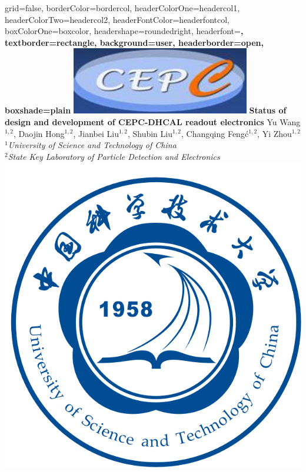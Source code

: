 \documentclass[a0paper,portrait]{baposter}
\begin{document}
\begin{poster}{
grid=false,
borderColor=bordercol, %
headerColorOne=headercol1, %
headerColorTwo=headercol2, %
headerFontColor=headerfontcol, %
boxColorOne=boxcolor, %
headershape=roundedright, %
headerfont=\Large\sf\bf, %
textborder=rectangle,
background=user,
headerborder=open, %
boxshade=plain
}
{\includegraphics[scale=0.3]{CEPCLogo.jpg}}
%
%
{ \bf  \huge {Status of design and development of CEPC-DHCAL readout electronics} } %
{\vspace{0.3em} \smaller Yu Wang$^{1,2}$, Daojin Hong$^{1,2}$, Jianbei Liu$^{1,2}$, Shubin Liu$^{1,2}$, Changqing Feng\'c$^{1,2}$, Yi Zhou$^{1,2}$   \\  %
  
\smaller $^1$\it {University of Science and Technology of China} \\ $^2$\it{State Key Laboratory of Particle Detection and Electronics} } %
{\includegraphics[scale=0.2]{ustcblue.jpg}} %


\end{poster}
\end{document}
